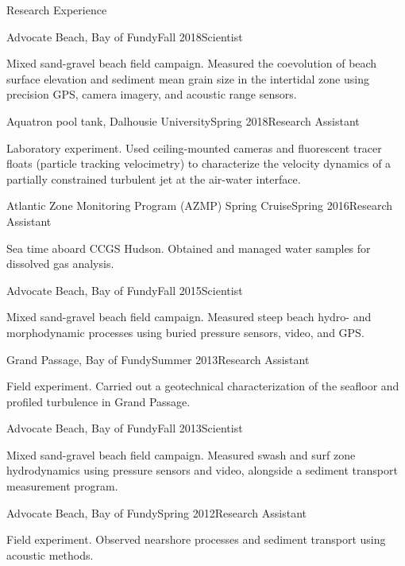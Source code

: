 \documentclass{resume} %
\begin{document}
\begin{rSection}{Research Experience}
	
	\begin{rSubsection}{Advocate Beach, Bay of Fundy}{Fall 2018}{Scientist}{}
		\item Mixed sand-gravel beach field campaign. Measured the coevolution of beach surface elevation and sediment mean grain size in the intertidal zone using precision GPS, camera imagery, and acoustic range sensors.
	\end{rSubsection}
		
	\begin{rSubsection}{Aquatron pool tank, Dalhousie University}{Spring 2018}{Research Assistant}{}
		\item Laboratory experiment. Used ceiling-mounted cameras and fluorescent tracer floats (particle tracking velocimetry) to characterize the velocity dynamics of a partially constrained turbulent jet at the air-water interface.
	\end{rSubsection}
	
	\begin{rSubsection}{Atlantic Zone Monitoring Program (AZMP) Spring Cruise}{Spring 2016}{Research Assistant}{}
		\item Sea time aboard CCGS Hudson. Obtained and managed water samples for dissolved gas analysis.
	\end{rSubsection}
	
	\begin{rSubsection}{Advocate Beach, Bay of Fundy}{Fall 2015}{Scientist}{}
		\item Mixed sand-gravel beach field campaign. Measured steep beach hydro- and morphodynamic processes using buried pressure sensors, video, and GPS.
	\end{rSubsection}
	
	\begin{rSubsection}{Grand Passage, Bay of Fundy}{Summer 2013}{Research Assistant}{}
		\item Field experiment. Carried out a geotechnical characterization of the seafloor and profiled turbulence in Grand Passage.
	\end{rSubsection}

	\begin{rSubsection}{Advocate Beach, Bay of Fundy}{Fall 2013}{Scientist}{}
		\item Mixed sand-gravel beach field campaign. Measured swash and surf zone hydrodynamics using pressure sensors and video, alongside a sediment transport measurement program.
	\end{rSubsection}
	
	\begin{rSubsection}{Advocate Beach, Bay of Fundy}{Spring 2012}{Research Assistant}{}
		\item Field experiment. Observed nearshore processes and sediment transport using acoustic methods.
	\end{rSubsection}

\end{rSection}
\end{document}
